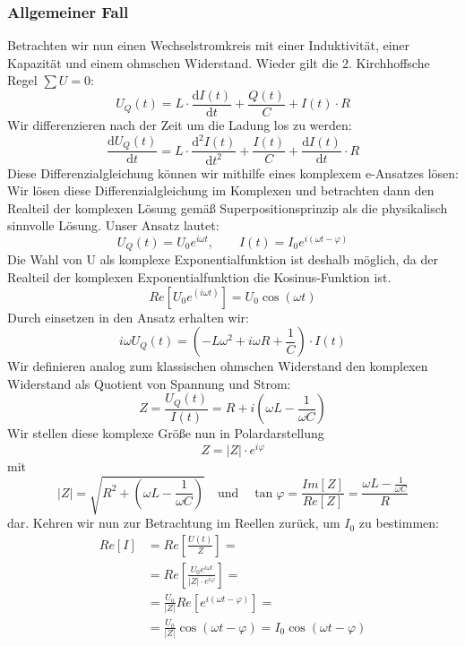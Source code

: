 \subsubsection{Allgemeiner Fall}
Betrachten wir nun einen Wechselstromkreis mit einer Induktivität, einer Kapazität und einem ohmschen Widerstand. Wieder gilt die 2. Kirchhoffsche Regel $\sum U = 0$:
\begin{equation}
U_Q(t) = L \cdot \frac{\mathrm{d}I(t)}{\mathrm{d}t} + \frac{Q(t)}{C} + I(t) \cdot R
\end{equation}
Wir differenzieren nach der Zeit um die Ladung los zu werden:
\begin{equation}
\frac{\mathrm dU_Q(t)}{\mathrm dt} = L \cdot \frac{\mathrm{d^2}I(t)}{\mathrm{d}t^2} + \frac{I(t)}{C} + \frac{\mathrm dI(t)}{\mathrm dt} \cdot R
\end{equation}
Diese Differenzialgleichung können wir mithilfe eines komplexem e-Ansatzes lösen:
Wir lösen diese Differenzialgleichung im Komplexen und betrachten dann den Realteil der komplexen Lösung gemäß Superpositionsprinzip als die physikalisch sinnvolle Lösung. Unser Ansatz lautet:
\begin{equation}
U_Q(t) = U_0 e^{i\omega t},	\qquad	I(t) = I_0 e^{i(\omega t-\varphi)}
\end{equation}
Die Wahl von U als komplexe Exponentialfunktion ist deshalb möglich, da der Realteil der komplexen Exponentialfunktion die Kosinus-Funktion ist.
\begin{equation}
Re\left[ U_0 e^{(i\omega t)}\right]  = U_0 \cos{(\omega t)}
\end{equation}
Durch einsetzen in den Ansatz erhalten wir:
\begin{equation}
i\omega U_Q(t) = (- L \omega^2 + i \omega R  + \frac{1}{C}) \cdot I(t)
\end{equation}
Wir definieren analog zum klassischen ohmschen Widerstand den komplexen Widerstand als Quotient von Spannung und Strom:
\begin{equation}
Z = \frac{U_Q(t)}{I(t)} = R + i ( \omega L - \frac{1}{\omega C})
\end{equation}
Wir stellen diese komplexe Größe nun in Polardarstellung
\begin{equation}
Z = |Z| \cdot e^{i\varphi}
\end{equation}
mit
\begin{equation}\label{eq:Zpolar}
|Z| = \sqrt{ R^2 + \left( \omega L - \frac{1}{\omega C} \right) }\quad {\mathrm{und}} \quad \tan\varphi = \frac{Im[Z]}{Re[Z]} = \frac{\omega L - \frac{1}{\omega C}}{R}
\end{equation}
dar. Kehren wir nun zur Betrachtung im Reellen zurück, um $I_0$ zu bestimmen:
\begin{align}
\nonumber
Re\left[ I \right]
&= Re\left[ \frac{U(t)}{Z} \right] =\\\nonumber
&= Re\left[ \frac{U_0 e^{i\omega t}}{|Z|\cdot e^{i\varphi}} \right] =\\\nonumber
&= \frac{U_0}{|Z|} Re\left[ e^{i(\omega t - \varphi)} \right] =\\
&= \frac{U_0}{|Z|} \cos(\omega t - \varphi) = I_0 \cos(\omega t - \varphi)
\end{align}

